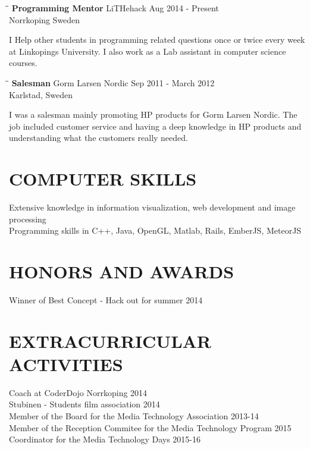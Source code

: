 \documentclass{res}
\begin{document}
\begin{resume}
   \begin{tabbing}
   \hspace{2.3in}\= \hspace{2.6in}\= \kill %
    {\bf Programming Mentor} \>LiTHehack \> Aug 2014 - Present\\
                          \>Norrkoping Sweden
   \end{tabbing}\vspace{-20pt}
    I Help other students in programming related questions once or twice every week at Linkopings University. I also work as a Lab assistant in computer science courses.

   \begin{tabbing}%
   \hspace{2.3in}\= \hspace{2.6in}\= \kill %
   {\bf Salesman}  \>Gorm Larsen Nordic \> Sep 2011 - March 2012\\
                          \>Karlstad, Sweden
   \end{tabbing}\vspace{-20pt}
    I was a salesman mainly promoting HP products for Gorm Larsen Nordic. The job included customer service and having a deep knowledge in HP products and understanding what the customers really needed.        


\section{COMPUTER SKILLS}          
	Extensive knowledge in information visualization, web development and image processing \\   
    Programming skills in C++, Java, OpenGL, Matlab, Rails, EmberJS, MeteorJS
 
 
\section{HONORS AND AWARDS}          
    Winner of Best Concept - Hack out for summer 2014   
 
\section{EXTRACURRICULAR ACTIVITIES}          
    Coach at CoderDojo Norrkoping 2014\\         
    Stubinen - Students film association 2014\\     
    Member of the Board for the Media Technology Association  2013-14\\ 
    Member of the Reception Commitee for the Media Technology Program  2015\\
    Coordinator for the Media Technology Days 2015-16\\ 

           
 
\end{resume}
\end{document}
